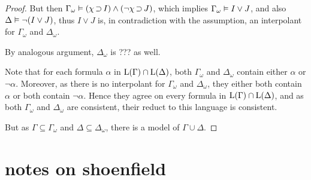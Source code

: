 \begin{proof}
But then
$\Gamma_\omega \vDash (\chi \operatorname{\supset} I) \land (\lnot \chi \operatorname{\supset} J)$, which implies $\Gamma_\omega \vDash I\lor J$, and also $\Delta\vDash \lnot (I \lor J)$, thus $I\lor J$ is, in contradiction with the assumption, an interpolant for $\Gamma_\omega$ and $\Delta_\omega$.

By analogous argument, $\Delta_\omega$ is ??? as well. 

Note that for each formula $\alpha$ in $\operatorname{L}(\Gamma) \cap \operatorname{L}(\Delta)$,
both $\Gamma_\omega$ and $\Delta_\omega$ contain either $\alpha$ or $\lnot \alpha$.
Moreover, as there is no interpolant for $\Gamma_\omega$ and $\Delta_\omega$, they either both contain $\alpha$ or both contain $\lnot \alpha$.
Hence they agree on every formula in $\operatorname{L}(\Gamma) \cap \operatorname{L}(\Delta)$, and as both $\Gamma_\omega$ and $\Delta_\omega$ are consistent, their reduct to this language is consistent.

But as $\Gamma \subseteq \Gamma_\omega$ and 
$\Delta \subseteq \Delta_\omega$, there is a model of $\Gamma \cup \Delta$.






\end{proof}


\clearpage



\section{notes on shoenfield}

